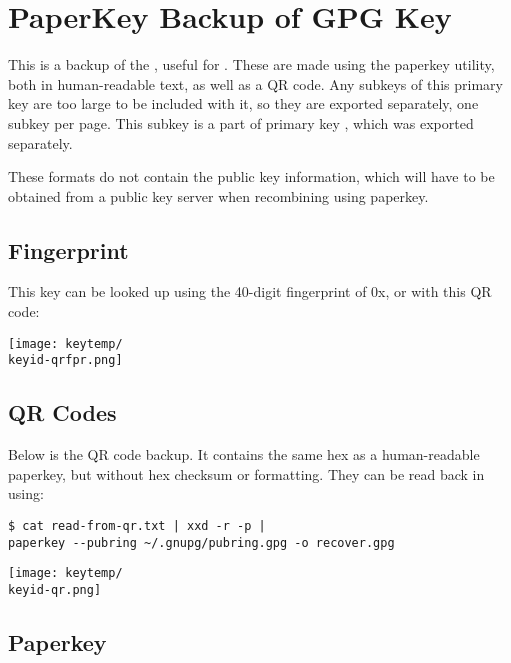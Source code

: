 \documentclass[10pt]{article}
\begin{document}
\section*{PaperKey Backup of GPG Key \keyid}

This is a backup of the \keytype \space \keyid, useful for \keyusage. These are made using the paperkey utility, both in human-readable text, as well as a QR code. 
\ifx\keyid\primarykey
Any subkeys of this primary key are too large to be included with it, so they are exported separately, one subkey per page.
\else
This subkey is a part of primary key \primarykey, which was exported separately.
\fi

These formats do not contain the public key information, which will have to be obtained from a public key server when recombining using paperkey.

\begin{multicols}{2}

\subsection*{Fingerprint}

This key can be looked up using the 40-digit fingerprint of \scriptsize 0x\keyfingerprint \normalsize, or with this QR code:

\begin{center}
\texttt{[image: keytemp/\\keyid-qrfpr.png]}
\end{center}

\subsection*{QR Codes}


Below is the QR code backup. It contains the same hex as a human-readable paperkey, but without hex checksum or formatting. They can be read back in using:
\begin{lstlisting}
$ cat read-from-qr.txt | xxd -r -p | 
paperkey --pubring ~/.gnupg/pubring.gpg -o recover.gpg
\end{lstlisting}

\begin{center}
\texttt{[image: keytemp/\\keyid-qr.png]}
\end{center}

\columnbreak

\subsection*{Paperkey}



\end{multicols}
\end{document}
